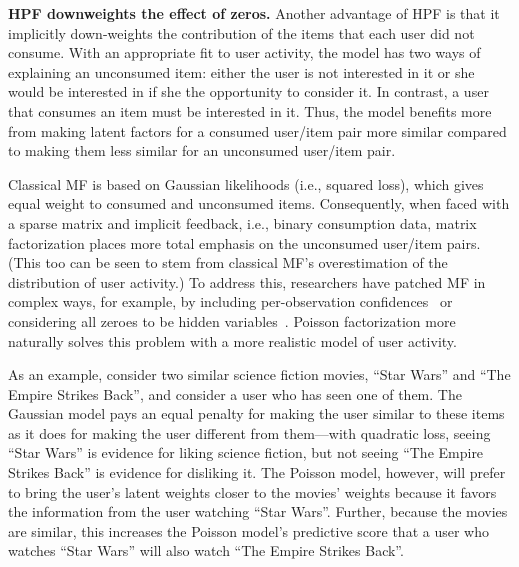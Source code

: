 
{\bf HPF downweights the effect of zeros.}  Another advantage of HPF
is that it implicitly down-weights the contribution of the items that
each user did not consume.  With an appropriate fit to user activity,
the model has two ways of explaining an unconsumed item: either the
user is not interested in it or she would be interested in if she the
opportunity to consider it. In contrast, a user that consumes an item
must be interested in it.  Thus, the model benefits more from making
latent factors for a consumed user/item pair more similar compared to
making them less similar for an unconsumed user/item pair.

Classical MF is based on Gaussian likelihoods (i.e., squared loss),
which gives equal weight to consumed and unconsumed items.
Consequently, when faced with a sparse matrix and implicit feedback,
i.e., binary consumption data, matrix factorization places more total
emphasis on the unconsumed user/item pairs.  (This too can be seen to
stem from classical MF's overestimation of the distribution of user
activity.)  To address this, researchers have patched MF in complex
ways, for example, by including per-observation
confidences~\cite{Koren:2009} or considering all zeroes to be hidden
variables~\cite{Paquet:2013p9197}.  Poisson factorization more
naturally solves this problem with a more realistic model of user
activity.

As an example, consider two similar science fiction movies, ``Star
Wars'' and ``The Empire Strikes Back'', and consider a user who has
seen one of them.  The Gaussian model pays an equal penalty for making
the user similar to these items as it does for making the user
different from them---with quadratic loss, seeing ``Star Wars'' is
evidence for liking science fiction, but not seeing ``The Empire
Strikes Back'' is evidence for disliking it.  The Poisson model,
however, will prefer to bring the user's latent weights closer to the
movies' weights because it favors the information from the user
watching ``Star Wars''. Further, because the movies are similar, this
increases the Poisson model's predictive score that a user who watches
``Star Wars'' will also watch ``The Empire Strikes Back''. 

